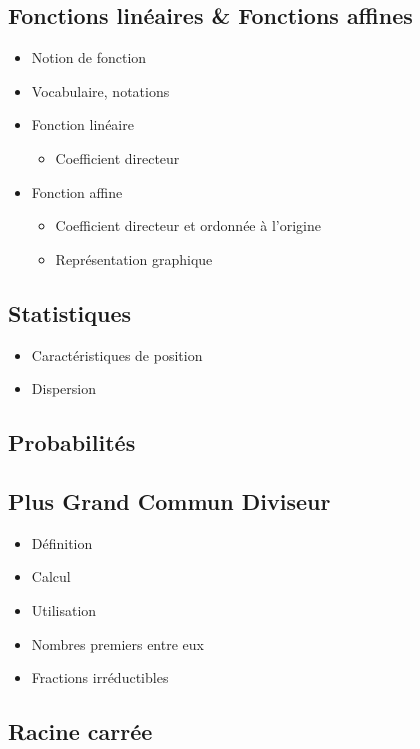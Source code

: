 \subsection{Fonctions linéaires \& Fonctions affines}

\begin{itemize}
	\item Notion de fonction
	\item Vocabulaire, notations
	\item Fonction linéaire
	\begin{itemize}
		\item Coefficient directeur
	\end{itemize}
	\item Fonction affine
	\begin{itemize}
		\item Coefficient directeur et ordonnée à l'origine
		\item Représentation graphique 
	\end{itemize}
\end{itemize}

\subsection{Statistiques}

\begin{itemize}
	\item Caractéristiques de position
	\item Dispersion
\end{itemize}

\subsection{Probabilités}

\subsection{Plus Grand Commun Diviseur}

\begin{itemize}
	\item Définition
	\item Calcul
	\item Utilisation
	\item Nombres premiers entre eux
	\item Fractions irréductibles
\end{itemize}

\subsection{Racine carrée}

